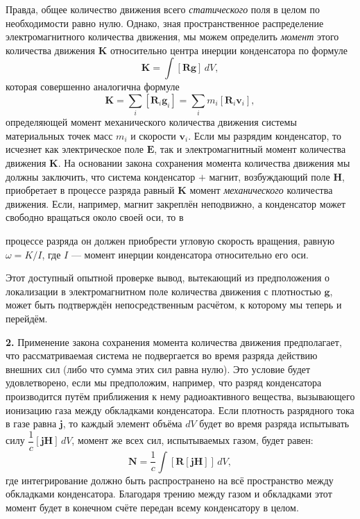 \documentclass[a4paper,12pt]{article}
\begin{document}
Правда, общее количество движения всего \textit{статического} поля
в целом по необходимости равно нулю. Однако, зная пространственное
распределение электромагнитного количества движения, мы можем определить
\textit{момент} этого количества движения $\mathbf{K}$ относительно
центра инерции конденсатора по формуле
\begin{equation}
    \mathbf{K} = \int[\mathbf{R}\mathbf{g}]\,dV,
    \tag{104.2}
\end{equation}
которая совершенно аналогична формуле
$$
    \mathbf{K} = \sum_i[\mathbf{R}_i\mathbf{g}_i] = \sum_i m_i[\mathbf{R}_i\mathbf{v}_i],
$$
определяющей момент механического количества движения системы
материальных точек масс $m_i$ и скорости $\mathbf{v}_i$. Если мы разрядим
конденсатор, то исчезнет как электрическое поле $\mathbf{E}$, так и
электромагнитный момент количества движения $\mathbf{K}$. На основании
закона сохранения момента количества движения мы должны заключить, что
система конденсатор $+$ магнит, возбуждающий поле $\mathbf{H}$, приобретает
в процессе разряда равный $\mathbf{K}$ момент \textit{механического}
количества движения. Если, например, магнит закреплён неподвижно,
а конденсатор может свободно вращаться около своей оси, то в


процессе разряда он должен приобрести угловую скорость вращения, равную
$\omega = K/I$, где $I$ — момент инерции конденсатора относительно его оси.

Этот доступный опытной проверке вывод, вытекающий из предположения
о локализации в электромагнитном поле количества движения с плотностью
$\mathbf{g}$, может быть подтверждён непосредственным расчётом, к которому
мы теперь и перейдём.

\textbf{2.} Применение закона сохранения момента количества движения
предполагает, что рассматриваемая система не подвергается во время
разряда действию внешних сил (либо что сумма этих сил равна нулю). Это
условие будет удовлетворено, если мы предположим, например, что разряд
конденсатора производится путём приближения к нему радиоактивного
вещества, вызывающего ионизацию газа между обкладками конденсатора.
Если плотность разрядного тока в газе равна $\mathbf{j}$, то каждый
элемент объёма $dV$ будет во время разряда испытывать силу
$\dfrac{1}{c}[\mathbf{j}\mathbf{H}]\,dV$, момент же всех сил, испытываемых
газом, будет равен:
\begin{equation}
    \mathbf{N} = \frac{1}{c}\int[\mathbf{R}[\mathbf{j}\mathbf{H}]]\,dV,
    \tag{104.3}
\end{equation}
где интегрирование должно быть распространено на всё пространство
между обкладками конденсатора. Благодаря трению между газом и обкладками
этот момент будет в конечном счёте передан всему конденсатору в целом.
\end{document}
